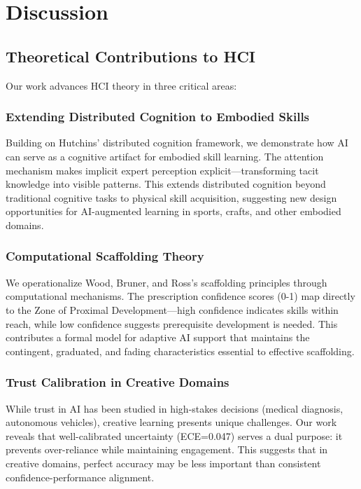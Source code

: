 \documentclass[sigconf,review,anonymous]{acmart}
\begin{document}
\section{Discussion}

\subsection{Theoretical Contributions to HCI}

Our work advances HCI theory in three critical areas:

\subsubsection{Extending Distributed Cognition to Embodied Skills}
Building on Hutchins' distributed cognition framework, we demonstrate how AI can serve as a cognitive artifact for embodied skill learning. The attention mechanism makes implicit expert perception explicit—transforming tacit knowledge into visible patterns. This extends distributed cognition beyond traditional cognitive tasks to physical skill acquisition, suggesting new design opportunities for AI-augmented learning in sports, crafts, and other embodied domains.

\subsubsection{Computational Scaffolding Theory}
We operationalize Wood, Bruner, and Ross's scaffolding principles through computational mechanisms. The prescription confidence scores (0-1) map directly to the Zone of Proximal Development—high confidence indicates skills within reach, while low confidence suggests prerequisite development is needed. This contributes a formal model for adaptive AI support that maintains the contingent, graduated, and fading characteristics essential to effective scaffolding.

\subsubsection{Trust Calibration in Creative Domains}
While trust in AI has been studied in high-stakes decisions (medical diagnosis, autonomous vehicles), creative learning presents unique challenges. Our work reveals that well-calibrated uncertainty (ECE=0.047) serves a dual purpose: it prevents over-reliance while maintaining engagement. This suggests that in creative domains, perfect accuracy may be less important than consistent confidence-performance alignment.
\end{document}
